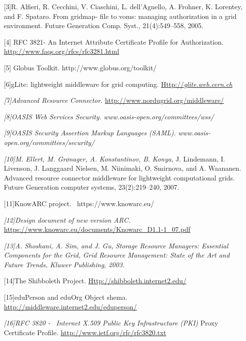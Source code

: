 \documentclass{article}
\newcommand\textstyleCitation[1]{\textit{#1}}
\begin{document}
[3]R. Alfieri, R. Cecchini, V. Ciaschini, L.
dell{\textquoteright}Agnello, A. Frohner, K. Lorentey, and F. Spataro.
From gridmap- file to voms: managing authorization in a grid
environment. Future Generation Comp. Syst., 21(4):549--558, 2005. 

[4] RFC 3821- An Internet Attribute Certificate Profile for
Authorization. \url{http://www.faqs.org/rfcs/rfc3281.html}

[5] Globus Toolkit. http://www.globus.org/toolkit/

[6]gLite: lightweight middleware for grid computing.
\href{http://glite.web.cern.ch/}{Http://}\href{http://glite.web.cern.ch/}{\textstyleCitation{\textup{glite.web.cern.ch}}}

\textstyleCitation{\textup{[7]Advanced Resource Connector.
}}\url{http://www.nordugrid.org/middleware/}

\textstyleCitation{\textup{[8]OASIS Web Services Security.
www.oasis-open.org/committees/wss/}}

\textstyleCitation{\textup{[9]OASIS Security Assertion Markup Languages
(SAML). www.oasis-open.org/committees/security/}}

\textstyleCitation{\textup{[10]}}\textstyleCitation{\textup{M. Ellert,
M. Gr{\o}nager, A. Konstantinov, B. Konya, }}J. Lindemann, I. Livenson,
J. Langgaard Nielsen, M. Niinimaki, O. Smirnova, and A. Waananen.
Advanced resource connector middleware for lightweight computational
grids. Future Generation computer systems, 23(2):219--240, 2007.

[11]KnowARC project. \ https://www.knowarc.eu/

\textstyleCitation{\textup{[12]Design document of new version ARC.
}}\url{https://www.knowarc.eu/documents/Knowarc_D1.1-1_07.pdf}

\textstyleCitation{\textup{[13]A. Shoshani, A. Sim, and J. Gu,
}}\textstyleCitation{Storage Resource Managers: Essential Components
for the Grid}\textstyleCitation{\textup{, Grid Resource Management:
State of the Art and Future Trends, Kluwer Publishing, 2003.}}

[14]The Shibboleth Project.
\href{http://shibboleth.internet2.edu/}{Http://shibboleth.internet2.edu/}

[15]eduPerson and eduOrg Object shema.
\url{http://middleware.internet2.edu/eduperson/}

\textstyleCitation{\textup{[16]RFC 3820 - \ Internet X.509 Public Key
Infrastructure (PKI)}} Proxy Certificate Profile.
\url{http://www.ietf.org/rfc/rfc3820.txt}
\end{document}
